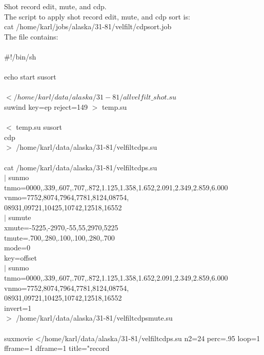 Shot record edit, mute, and cdp. \\
The script to apply shot record edit, mute, and cdp sort is: \\
cat /home/karl/jobs/alaska/31-81/velfilt/cdpsort.job \\
The file contains: \\
\\
\#!/bin/sh \\
 \\
echo start susort \\
 \\
$< /home/karl/data/alaska/31-81/allvelfilt\_shot.su$ \ \\
suwind key=ep reject=149 $>$ temp.su  \\
 \\
$<$ temp.su susort \ \\
       cdp \ \\
$>$ /home/karl/data/alaska/31-81/velfiltcdps.su  \\
 \\
cat /home/karl/data/alaska/31-81/velfiltcdps.su \ \\
$|$ sunmo \ \\
    tnmo=0000,.339,.607,.707,.872,1.125,1.358,1.652,2.091,2.349,2.859,6.000 \ \\
    vnmo=7752,8074,7964,7781,8124,08754,\\
08931,09721,10425,10742,12518,16552 \ \\
$|$ sumute \ \\
    xmute=-5225,-2970,-55,55,2970,5225 \ \\
    tmute=.700,.280,.100,.100,.280,.700 \ \\
    mode=0  \ \\
    key=offset  \ \\
$|$ sunmo \ \\
    tnmo=0000,.339,.607,.707,.872,1.125,1.358,1.652,2.091,2.349,2.859,6.000 \ \\
    vnmo=7752,8074,7964,7781,8124,08754,\\
08931,09721,10425,10742,12518,16552 \ \\
    invert=1 \ \\
$>$  /home/karl/data/alaska/31-81/velfiltcdpsmute.su \\
 \\
suxmovie </home/karl/data/alaska/31-81/velfiltcdps.su  n2=24 perc=.95 loop=1  fframe=1 dframe=1 title="record %